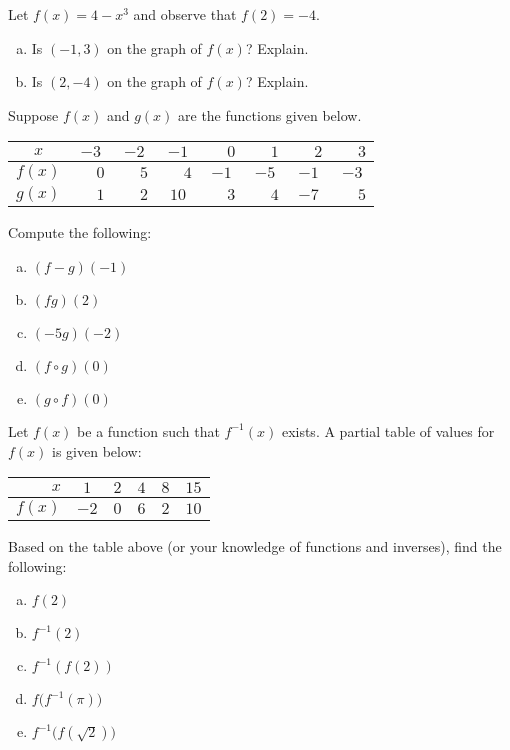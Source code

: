 \documentclass[12pt,letterpaper]{exam}
\begin{document}
\begin{questions}
\newpage
\question[10] Let $f(x)= 4 - x^3$ and observe that $f(2)= -4$. 
	\begin{enumerate}[(a)]
	\item Is $(-1, 3)$ on the graph of $f(x)$? Explain. 
	\item Is $(2, -4)$ on the graph of $f(x)$? Explain. 
	\end{enumerate}



\newpage
\question[10]
Suppose $f(x)$ and $g(x)$ are the functions given below. 
        \begin{table}[!ht]
        \centering
        \begin{tabular}{| c || c | c | c | c | c | c | c |} \hline
	$x$ & $-3$ & $-2$ & $-1$ & $\phantom{-}0$ & $\phantom{-}1$ & $\phantom{-}2$ & $\phantom{-}3$ \\ \hline
	$f(x)$ & $\phantom{-}0$ & $\phantom{-}5$ & $\phantom{-}4$ & $-1$ & $-5$ & $-1$ & $-3$ \\ \hline
	$g(x)$ & $\phantom{-}1$ & $\phantom{-}2$ & $10$ & $\phantom{-}3$ & $\phantom{-}4$ & $-7$ & $\phantom{-}5$  \\ \hline
        \end{tabular}
        \end{table}

Compute the following: 
        \begin{enumerate}[(a)]
	\item $(f - g)(-1)$
	\item $(fg)(2)$
	\item $(-5g)(-2)$
	\item $(f \circ g)(0)$
	\item $(g \circ f)(0)$
        \end{enumerate} 



\newpage
\question[10] Let $f(x)$ be a function such that $f^{-1}(x)$ exists. A partial table of values for $f(x)$ is given below: \par
	\begin{table}[!ht]
	\centering
	\begin{tabular}{|r||c|c|c|c|c|} \hline 
	$x$ & $1$ & $2$ & $4$ & $8$ & $15$ \\ \hline
	$f(x)$ & $-2$ & $0$ & $6$ & $2$ & $10$ \\ \hline
	\end{tabular}
	\end{table}
Based on the table above (or your knowledge of functions and inverses), find the following:
	\begin{enumerate}[(a)]
	\item $f(2)$
	\item $f^{-1}(2)$
	\item $f^{-1}(f(2))$
	\item $f \big(f^{-1}(\pi) \big)$
	\item $f^{-1} \big( f(\sqrt{2}) \big)$
	\end{enumerate}




\end{questions}
\end{document}
